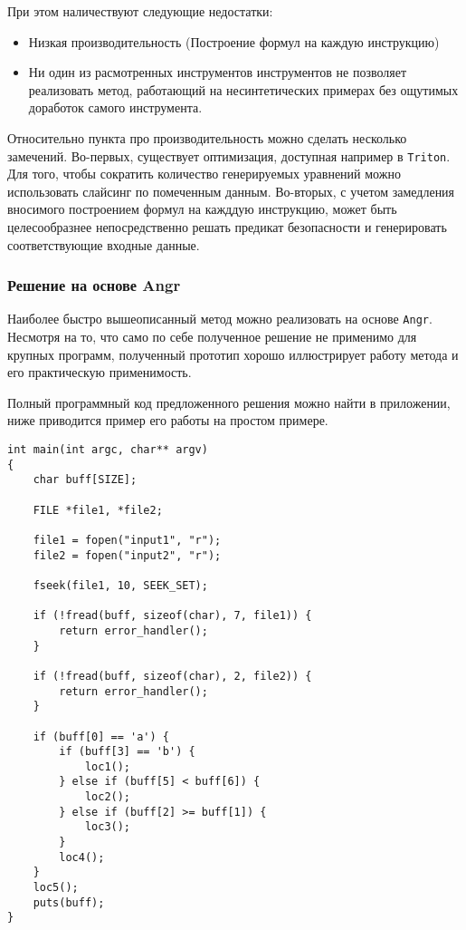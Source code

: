 При этом наличествуют следующие недостатки:
\begin{itemize}
  \item Низкая производительность (Построение формул на каждую инструкцию)
  \item Ни один из расмотренных инструментов инструментов не позволяет реализовать метод, работающий на несинтетических примерах без ощутимых доработок самого инструмента.
\end{itemize}

Относительно пункта про производительность можно сделать несколько замечений.
Во-первых, существует оптимизация, доступная например в \texttt{Triton}. Для того, чтобы сократить количество генерируемых уравнений можно использовать слайсинг по помеченным данным.
Во-вторых, с учетом замедления вносимого построением формул на кажддую инструкцию, может быть целесообразнее непосредственно решать предикат безопасности и генерировать соответствующие входные данные.

\subsubsection{Решение на основе Angr}

Наиболее быстро вышеописанный метод можно реализовать на основе \texttt{Angr}. Несмотря на то, что само по себе полученное решение не применимо для крупных программ, полученный прототип хорошо иллюстрирует работу метода и его практическую применимость.

Полный программный код предложенного решения можно найти в приложении, ниже приводится пример его работы на простом примере.

\begin{lstlisting}[environoment=C_LANG, caption=jumper.c, captionpos=b]
int main(int argc, char** argv)
{
    char buff[SIZE];

    FILE *file1, *file2;

    file1 = fopen("input1", "r");
    file2 = fopen("input2", "r");

    fseek(file1, 10, SEEK_SET);

    if (!fread(buff, sizeof(char), 7, file1)) {
        return error_handler();
    }

    if (!fread(buff, sizeof(char), 2, file2)) {
        return error_handler();
    }

    if (buff[0] == 'a') {
        if (buff[3] == 'b') {
            loc1();
        } else if (buff[5] < buff[6]) {
            loc2();
        } else if (buff[2] >= buff[1]) {
            loc3();
        }
        loc4();
    }
    loc5();
    puts(buff);
}
\end{lstlisting}


